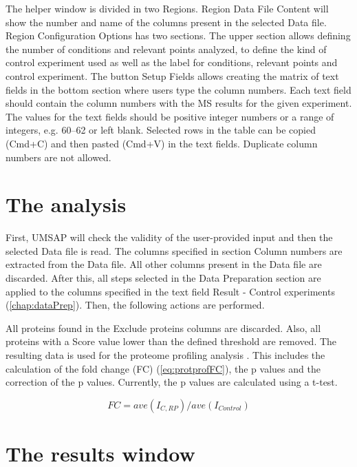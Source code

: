 The helper window is divided in two Regions. Region Data File Content will show the 
number and name of the columns present in the selected Data file. Region
Configuration Options has two sections. The upper section allows defining the number
of conditions and relevant points analyzed, to define the kind of control experiment
used as well as the label for conditions, relevant points and control experiment.
The button Setup Fields allows creating the matrix of text fields in the bottom section
where users type the column numbers. Each text field should contain the column
numbers with the MS results for the given experiment. The values for the text fields
should be positive integer numbers or a range of integers, e.g. 
\numrange[range-phrase=--]{60}{62} or left blank. Selected rows in the table can
be copied (Cmd+C) and then pasted (Cmd+V) in the text fields. Duplicate column numbers
are not allowed. 

\section{The analysis}
\label{sec:protprofTTest}

First, UMSAP will check the validity of the user-provided input and then the selected
Data file is read. The columns specified in section Column numbers are extracted
from the Data file. All other columns present in the Data file are discarded. After
this, all steps selected in the Data Preparation section are applied to the columns
specified in the text field Result - Control experiments (\autoref{chap:dataPrep}).
Then, the following actions are performed.

All proteins found in the Exclude proteins columns are discarded. Also, all proteins
with a Score value lower than the defined threshold are removed. The resulting data
is used for the proteome profiling analysis \cite{Aguilan2020}. This includes the
calculation of the fold change (FC) (\autoref{eq:protprofFC}), the p values and the correction
of the p values. Currently, the p values are calculated using a t-test.

\begin{equation}
\label{eq:protprofFC}
FC = ave(I_{C, RP}) / ave(I_{Control})
\end{equation}

\section{The results window}

